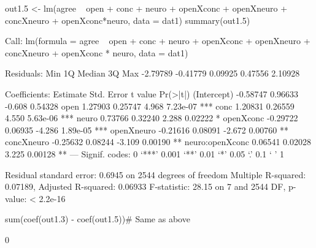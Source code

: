 \begin{Schunk}
\begin{Sinput}
 out1.5 <- lm(agree ~ open + conc + neuro +
                  openXconc + openXneuro + concXneuro + openXconc*neuro,
              data = dat1)
 summary(out1.5)
\end{Sinput}
\begin{Soutput}
Call:
lm(formula = agree ~ open + conc + neuro + openXconc + openXneuro + 
    concXneuro + openXconc * neuro, data = dat1)

Residuals:
     Min       1Q   Median       3Q      Max 
-2.79789 -0.41779  0.09925  0.47556  2.10928 

Coefficients:
                Estimate Std. Error t value Pr(>|t|)    
(Intercept)     -0.58747    0.96633  -0.608  0.54328    
open             1.27903    0.25747   4.968 7.23e-07 ***
conc             1.20831    0.26559   4.550 5.63e-06 ***
neuro            0.73766    0.32240   2.288  0.02222 *  
openXconc       -0.29722    0.06935  -4.286 1.89e-05 ***
openXneuro      -0.21616    0.08091  -2.672  0.00760 ** 
concXneuro      -0.25632    0.08244  -3.109  0.00190 ** 
neuro:openXconc  0.06541    0.02028   3.225  0.00128 ** 
---
Signif. codes:  0 ‘***’ 0.001 ‘**’ 0.01 ‘*’ 0.05 ‘.’ 0.1 ‘ ’ 1

Residual standard error: 0.6945 on 2544 degrees of freedom
Multiple R-squared:  0.07189,	Adjusted R-squared:  0.06933 
F-statistic: 28.15 on 7 and 2544 DF,  p-value: < 2.2e-16
\end{Soutput}
\begin{Sinput}
 sum(coef(out1.3) - coef(out1.5))# Same as above
\end{Sinput}
\begin{Soutput}
[1] 0
\end{Soutput}
\end{Schunk}
